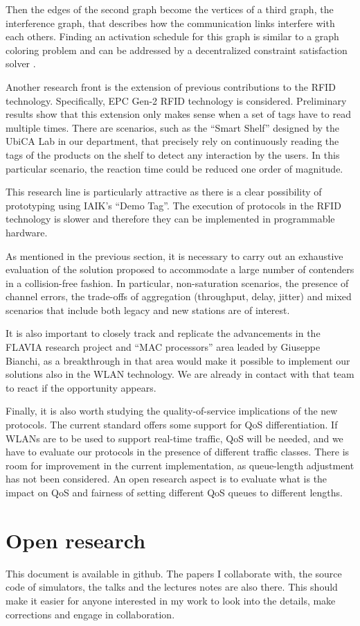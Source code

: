 \documentclass[a4paper,twocolumns]{article}%
\begin{document}
Then the edges of the second graph become the vertices of a third graph, the interference graph, that describes how the communication links interfere with each others.
Finding an activation schedule for this graph is similar to a graph coloring problem and can be addressed by a decentralized constraint satisfaction solver \cite{}.

Another research front is the extension of previous contributions to the RFID technology.
Specifically, EPC Gen-2 RFID technology is considered.
Preliminary results show that this extension only makes sense when a set of tags have to read multiple times.
There are scenarios, such as the ``Smart Shelf'' designed by the UbiCA Lab in our department, that precisely rely on continuously reading the tags of the products on the shelf to detect any interaction by the users.
In this particular scenario, the reaction time could be reduced one order of magnitude.

This research line is particularly attractive as there is a clear possibility of prototyping using IAIK's ``Demo Tag''.
The execution of protocols in the RFID technology is slower and therefore they can be implemented in programmable hardware.

As mentioned in the previous section, it is necessary to carry out an exhaustive evaluation of the solution proposed to accommodate a large number of contenders in a collision-free fashion.
In particular, non-saturation scenarios, the presence of channel errors, the trade-offs of aggregation (throughput, delay, jitter) and mixed scenarios that include both legacy and new stations are of interest.

It is also important to closely track and replicate the advancements in the FLAVIA research project and ``MAC processors'' area leaded by Giuseppe Bianchi, as a breakthrough in that area would make it possible to implement our solutions also in the WLAN technology.
We are already in contact with that team to react if the opportunity appears.

Finally, it is also worth studying the quality-of-service implications of the new protocols.
The current standard offers some support for QoS differentiation.
If WLANs are to be used to support real-time traffic, QoS will be needed, and we have to evaluate our protocols in the presence of different traffic classes.
There is room for improvement in the current implementation, as queue-length adjustment has not been considered.
An open research aspect is to evaluate what is the impact on QoS and fairness of setting different QoS queues to different lengths.

\section{Open research}

This document is available in github.
The papers I collaborate with, the source code of simulators, the talks and the lectures notes are also there.
This should make it easier for anyone interested in my work to look into the details, make corrections and engage in collaboration.




\end{document}
